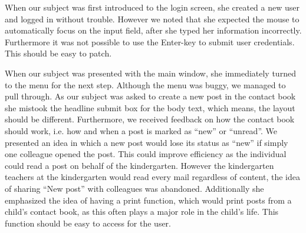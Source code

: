 When our subject was first introduced to the login screen, she created a new user and logged in without trouble. However we noted that she expected the mouse to automatically focus on the input field, after she typed her information incorrectly. Furthermore it was not possible to use the Enter-key to submit user credentials. This should be easy to patch.

When our subject was presented with the main window, she immediately turned to the menu for the next step. Although the menu was buggy, we managed to pull through. As our subject was asked to create a new post in the contact book she mistook the headline submit box for the body text, which means, the layout should be different. 
Furthermore, we received feedback on how the contact book should work, i.e. how and when a post is marked as ``new'' or ``unread''. We presented an idea in which a new post would lose its status as ``new'' if simply one colleague opened the post. This could improve efficiency as the individual could read a post on behalf of the kindergarten. However the kindergarten teachers at the kindergarten would read every mail regardless of content, the idea of sharing ``New post'' with colleagues was abandoned. 
Additionally she emphasized the idea of having a print function, which would print posts from a child's contact book, as this often plays a major role in the child's life. This function should be easy to access for the user.


